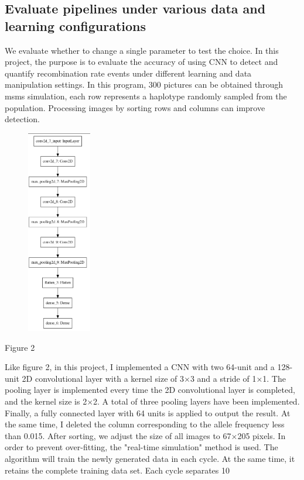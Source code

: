 \documentclass[11pt,a4 paper,title page]{article}
\begin{document}
    \subsection{Evaluate pipelines under various data and learning configurations}
  We evaluate whether to change a single parameter to test the choice. In this project, the purpose is to evaluate the accuracy of using CNN to detect and quantify recombination rate events under different learning and data manipulation settings. In this program, 300 pictures can be obtained through msms simulation, each row represents a haplotype randomly sampled from the population. Processing images by sorting rows and columns can improve detection.
\begin{figure}[H]
\centering
\includegraphics[width=0.25\textwidth,angle=360]{../picture/figure2.png}
\end{figure}
\centerline{Figure 2}
\hfill\break 
Like figure 2, in this project, I implemented a CNN with two 64-unit and a 128-unit 2D convolutional layer with a kernel size of 3×3 and a stride of 1×1. The pooling layer is implemented every time the 2D convolutional layer is completed, and the kernel size is 2×2. A total of three pooling layers have been implemented. Finally, a fully connected layer with 64 units is applied to output the result. At the same time, I deleted the column corresponding to the allele frequency less than 0.015. After sorting, we adjust the size of all images to 67×205 pixels. In order to prevent over-fitting, the "real-time simulation" method is used. The algorithm will train the newly generated data in each cycle. At the same time, it retains the complete training data set. Each cycle separates 10%
\hfill\break
\end{document}
